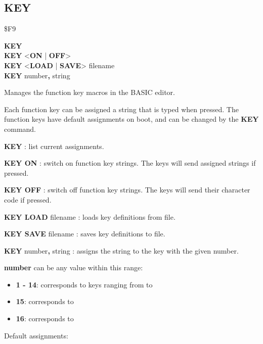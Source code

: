 \subsection{KEY}
\begin{description}[leftmargin=2cm,style=nextline]
\item [Token:] \$F9
\item [Format:] {\bf KEY} \\
		{\bf KEY} <{\bf ON} | {\bf OFF}> \\
		{\bf KEY} <{\bf LOAD} | {\bf SAVE}> filename \\
		{\bf KEY} number{\bf,} string
\item [Usage:] Manages the function key macros in the BASIC editor.

               Each function key can be assigned a string that is typed when
               pressed. The function keys have default assignments on boot,
               and can be changed by the {\bf KEY} command.

               {\bf KEY} : list current assignments.

               {\bf KEY ON} : switch on function key strings.
               The keys will send assigned strings if pressed.

               {\bf KEY OFF} : switch off function key strings.
               The keys will send their character code if pressed.

               {\bf KEY LOAD} filename : loads key definitions from file.

               {\bf KEY SAVE} filename : saves key definitions to file.

               {\bf KEY} number{\bf ,} string : assigns the string to
               the key with the given number.

               {\bf number} can be any value within this range:

                \begin{itemize}
                    \item {\bf 1 - 14}: corresponds to keys ranging from  to 
                    \item {\bf 15}: corresponds to 
                    \item {\bf 16}: corresponds to 
                \end{itemize}

               Default assignments:


\end{description}
